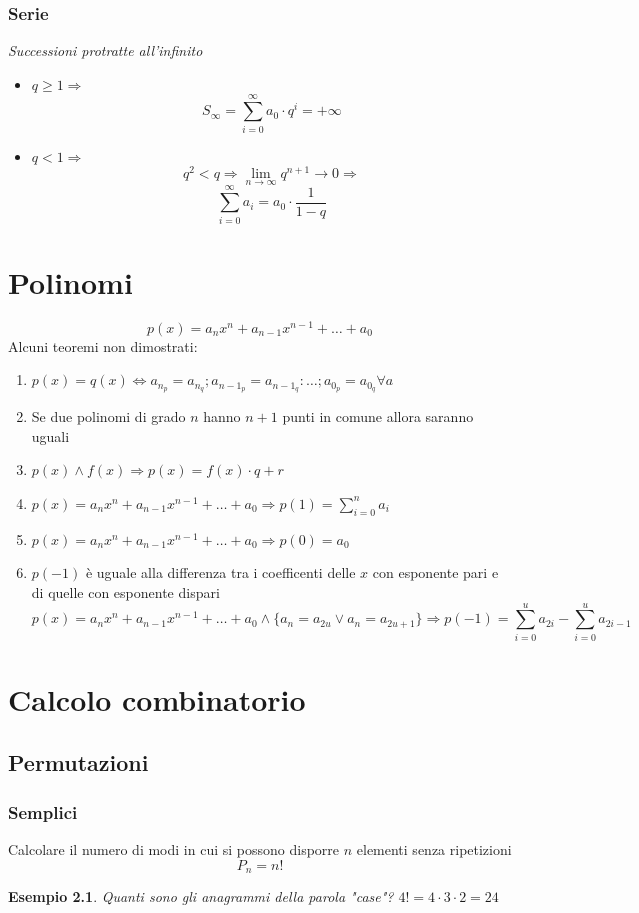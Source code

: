 \documentclass[12pt, a4paper,oneside]{report}
\begin{document}
	\subsection{Serie}
	\textit{Successioni protratte all'infinito}
	\begin{itemize}
		\item $q\ge1\Rightarrow$
		\[
		S_\infty=\sum_{i=0}^{\infty}a_0\cdot q^i=+\infty
		\]
		\item $q<1\Rightarrow$
		\[
		q^2<q\Rightarrow\lim_{n \to \infty}q^{n+1}\to 0\Rightarrow
		\]
		\[
		\sum_{i=0}^{\infty}a_i=a_0\cdot\frac{1}{1-q}
		\]
	\end{itemize}
\chapter{Polinomi}
	\[
	p(x)=a_nx^n+a_{n-1}x^{n-1}+\dots+a_0
	\]
	Alcuni teoremi non dimostrati:
	\begin{enumerate}
		\item $p(x)=q(x)\Leftrightarrow a_{n_p}=a_{n_q}; a_{{n-1}_p}=a_{{n-1}_q}:\dots;a_{0_p}=a_{0_q} \forall a$
		\item Se due polinomi di grado $n$ hanno $n+1$ punti in comune allora saranno uguali
		\item $p(x) \land f(x) \Rightarrow p(x)=f(x)\cdot q+r$
		\item $p(x)=a_nx^n+a_{n-1}x^{n-1}+\dots+a_0\Rightarrow p(1)=\sum_{i=0}^{n}a_i$
		\item $p(x)=a_nx^n+a_{n-1}x^{n-1}+\dots+a_0\Rightarrow p(0)=a_0$
		\item $p(-1)$ è uguale alla differenza tra i coefficenti delle $x$ con esponente pari e di quelle con esponente dispari
		\[
		p(x)=a_nx^n+a_{n-1}x^{n-1}+\dots+a_0\land \{a_n=a_{2u}\lor a_n=a_{2u+1}\}\Rightarrow p(-1)=\sum_{i=0}^{u}a_{2i}-\sum_{i=0}^{u}a_{2i-1}
		\]
	\end{enumerate}
\chapter{Calcolo combinatorio}
\section{Permutazioni}
	\subsection{Semplici}
	Calcolare il numero di modi in cui si possono disporre $n$ elementi senza ripetizioni
	\[
	P_n=n!
	\]
	\newtheorem*{esempio}{Esempio}
	\begin{esempio}
		Quanti sono gli anagrammi della parola "case"?
		$4!=4\cdot3\cdot2=24 $
	\end{esempio}
\end{document}
